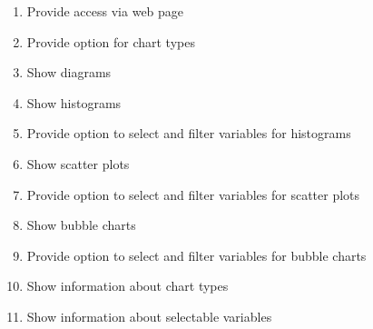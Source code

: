 \begin{enumerate}[label={{/F}\itemnumber*{/}}, series=func]
  \item Provide access via web page \label{f1}
    
  \item Provide option for \gls{chart} types \label{f2}
  
  \item Show \glspl{diagram} \label{f3}
  
  \item Show \glspl{histogram} \label{f4} %
    
  
  \item Provide option to select and filter variables for \glspl{histogram}  \label{f6}
  
  
  \item Show \glspl{scatter plot} \label{f7} %
  
  
  \item Provide option to select and filter variables for \glspl{scatter plot} \label{f9} 
  
  \item Show \glspl{bubble chart} \label{f10} %
  
 \item Provide option to select and filter variables for \glspl{bubble chart} \label{f11}
  
  
  \item Show information about \gls{chart} types \label{f13}
  
  \item Show information about selectable variables\label{f14}
  
  
\end{enumerate}


